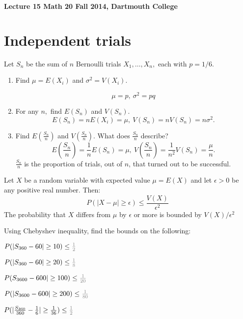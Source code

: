 \documentclass[english]{svjour3modified}
\begin{document}
\noindent\textbf{Lecture 15 \hfill Math 20 Fall 2014, Dartmouth College}\bigskip

\section{Independent trials}

\noindent Let $S_n$ be the sum of $n$ Bernoulli trials $X_1,\dots,X_n,$ each with $p=1/6.$ \medskip

\begin{enumerate}
\item Find $\mu=E(X_i)$ and $\sigma^2=V(X_i)$. 

\textcolor{black!50}{$$\mu=p,\ \sigma^2=pq$$}

\item For any $n,$ find $E(S_n)$ and $V(S_n)$. \textcolor{black!50}{$$E(S_n)=nE(X_i)=\mu,\ V(S_n)=nV(S_n)=n\sigma^2.$$}

\item Find $E(\frac{S_n}{n})$ and $V(\frac{S_n}{n})$. What does $\frac{S_n}{n}$ describe? \textcolor{black!50}{$$E(\frac{S_n}{n})=\frac{1}{n}E(S_n)=\mu,\ V(\frac{S_n}{n})=\frac{1}{n^2}V(S_n)=\frac{\mu}{n}.$$ $\frac{S_n}{n}$ is the proportion of trials, out of $n$, that turned out to be successful.}\end{enumerate}



\begin{theorem}

\noindent Let $X$ be a random variable with expected value $\mu=E(X)$ and let $\epsilon>0$ be any positive real number. Then: $$P(|X-\mu|\geq \epsilon)\leq \frac{V(X)}{\epsilon^2}$$ The probability that $X$ differs from $\mu$ by $\epsilon$ or more is bounded by $V(X)/\epsilon^2$
\end{theorem}\bigskip

\noindent Using Chebyshev inequality, find the bounds on the following:\bigskip\large


$P(|S_{360}-60|\geq 10)\leq\textcolor{black!50}{\frac{1}{2}}$ \bigskip

$P(|S_{360}-60|\geq 20)\leq \textcolor{black!50}{\frac{1}{8}}$ \bigskip

$P(S_{3600}-600|\geq 100)\leq\textcolor{black!50}{\frac{1}{20}}$ \bigskip

$P(|S_{3600}-600|\geq 200)\leq\textcolor{black!50}{\frac{1}{80}}$\bigskip

$P(|\frac{S_{360}}{360}-\frac{1}{6}|\geq \frac{1}{36})\leq \textcolor{black!50}{\frac{1}{2}}$ \bigskip
\end{document}
